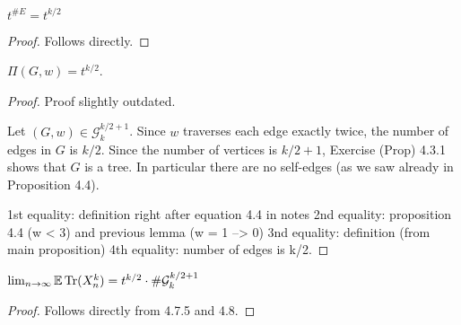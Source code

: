 \begin{lemma}
  \label{lemma:e_equals_k_over_two}
  \notready
  $t^{\#E} = t^{k/2}$
\end{lemma}

\begin{proof}
  \notready
  Follows directly.
\end{proof}



\begin{proposition}%
  \label{prop:product_g_w_to_exponential}
  \notready
  $\Pi(G,w) = t^{k/2}$.
\end{proposition}

\begin{proof}
  \notready
  Proof slightly outdated.

  Let $(G,w)\in\mathcal{G}^{k/2+1}_k$.  Since $w$ traverses each edge exactly twice, the number of edges in $G$ is $k/2$.  Since the number of vertices is $k/2+1$, Exercise (Prop) 4.3.1 shows that $G$ is a tree.  In particular there are no self-edges (as we saw already in Proposition 4.4).

  1st equality: definition right after equation 4.4 in notes
  2nd equality: proposition 4.4 (w < 3) and previous lemma (w = 1 --> 0)
  3nd equality: definition (from main proposition)
  4th equality: number of edges is k/2.
\end{proof}




\begin{proposition}%
  \label{prop:trace_ev_limit_equals_t_special_g}
  \notready
  $\lim_{n\to\infty} \mathbb{E}\operatorname{Tr}(X_n^k) = t^{k/2}\cdot\#\mathcal{G}_k^{k/2+1}$
\end{proposition}

\begin{proof}
  \notready
  Follows directly from 4.7.5 and 4.8.
\end{proof}




